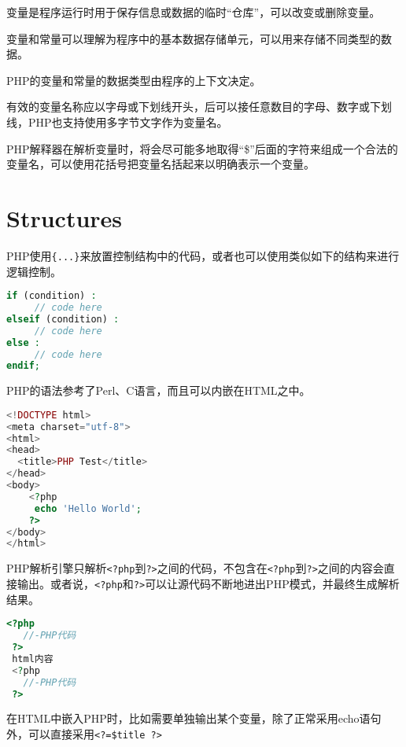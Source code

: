 \begin{compactitem}
\item 变量是程序运行时用于保存信息或数据的临时“仓库”，可以改变或删除变量。
\item 变量和常量可以理解为程序中的基本数据存储单元，可以用来存储不同类型的数据。
\item PHP的变量和常量的数据类型由程序的上下文决定。
\end{compactitem}




有效的变量名称应以字母或下划线开头，后可以接任意数目的字母、数字或下划线，PHP也支持使用多字节文字作为变量名。

PHP解释器在解析变量时，将会尽可能多地取得“\$”后面的字符来组成一个合法的变量名，可以使用花括号把变量名括起来以明确表示一个变量。





\section{Structures}


PHP使用\texttt{\{...\}}来放置控制结构中的代码，或者也可以使用类似如下的结构来进行逻辑控制。

\begin{lstlisting}[language=PHP]
if (condition) :
     // code here
elseif (condition) :
     // code here
else :
     // code here
endif;
\end{lstlisting}






PHP的语法参考了Perl、C语言，而且可以内嵌在HTML之中。

\begin{lstlisting}[language=PHP]
<!DOCTYPE html>
<meta charset="utf-8">
<html>
<head>
  <title>PHP Test</title>
</head>
<body>
	<?php
	 echo 'Hello World';
	?>
</body>
</html>
\end{lstlisting}

PHP解析引擎只解析\texttt{<?php}到\texttt{?>}之间的代码，不包含在\texttt{<?php}到\texttt{?>}之间的内容会直接输出。或者说，\texttt{<?php}和\texttt{?>}可以让源代码不断地进出PHP模式，并最终生成解析结果。

\begin{lstlisting}[language=PHP]
 <?php
   //-PHP代码
 ?>
 html内容
 <?php
   //-PHP代码
 ?>
\end{lstlisting}



在HTML中嵌入PHP时，比如需要单独输出某个变量，除了正常采用echo语句外，可以直接采用\verb|<?=$title ?>|


